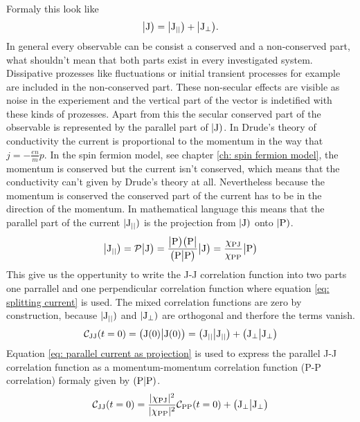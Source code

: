 Formaly this look like
%
\begin{align}
	\big|{\mathrm{J}}\big) = \big|{\mathrm{J}_{\mid\mid}}\big) + \big|{\mathrm{J}_{\bot}}\big).
	\label{eq: splitting current}
\end{align}
%
In general every observable can be consist a conserved and a non-conserved part, what shouldn't mean that both parts exist in every investigated system.
Dissipative prozesses like fluctuations or initial transient processes for example are included in the non-conserved part.
These non-secular effects are visible as noise in the experiement and the vertical part of the vector is indetified with these kinds of prozesses.
Apart from this the secular conserved part of the observable is represented by the parallel part of $|\mathrm{\mathrm{J}})$.
In Drude's theory of conductivity the current is proportional to the momentum in the way that $j = -\frac{en}{m}p$.
In the spin fermion model, see chapter \ref{ch: spin fermion model}, the momentum is conserved but the current isn't conserved, which means that the conductivity can't given by Drude's theory at all.
Nevertheless because the momentum is conserved the conserved part of the current has to be in the direction of the momentum.
In mathematical language this means that the parallel part of the current $|\mathrm{\mathrm{J}_{\mid\mid}})$ is the projection from $|\mathrm{\mathrm{J}})$ onto $|\mathrm{\mathrm{P}})$.
%
\begin{align}
	\big|{\mathrm{J}_{\mid\mid}}\big) = \mathcal{P}\big|{\mathrm{J}}\big) = \frac{\big|{\mathrm{P}}\big)\big({\mathrm{P}}\big|}{\big({\mathrm{P}}\big|{\mathrm{P}}\big)} \big|{\mathrm{J}}\big) = \frac{\chi_{\mathrm{PJ}}}{\chi_{\mathrm{PP}}} \big|{\mathrm{P}}\big)
	\label{eq: parallel current as projection}
\end{align}
%
This give us the oppertunity to write the J-J correlation function into two parts one parrallel and one perpendicular correlation function where equation \eqref{eq: splitting current} is used.
The mixed correlation functions are zero by construction, because $|\mathrm{\mathrm{J}_{\mid\mid}})$ and $|\mathrm{\mathrm{J}_{\bot}})$ are orthogonal and therfore the terms vanish.
%
\begin{align}
	\mathcal{C}_{\mathrm{JJ}}(t=0) = \big({\mathrm{J}(0)}\big|{\mathrm{J}(0)}\big) = \big({\mathrm{J}_{\mid\mid}}\big|{\mathrm{J}_{\mid\mid}}\big) + \big({\mathrm{J}_{\bot}}\big|{\mathrm{J}_{\bot}}\big)
\end{align}
%
Equation \eqref{eq: parallel current as projection} is used to express the parallel J-J correlation function as a momentum-momentum correlation function (P-P correlation) formaly given by $({\mathrm{P}}|{\mathrm{P}})$.
%
\begin{align}
	\mathcal{C}_{\mathrm{JJ}}(t=0) = \frac{\vert\chi_{\mathrm{PJ}}\vert^{2}}{\vert\chi_{\mathrm{PP}}\vert^{2}} \mathcal{C}_{\mathrm{PP}}(t=0) + \big({\mathrm{J}_{\bot}}\big|{\mathrm{J}_{\bot}}\big)
\end{align}
